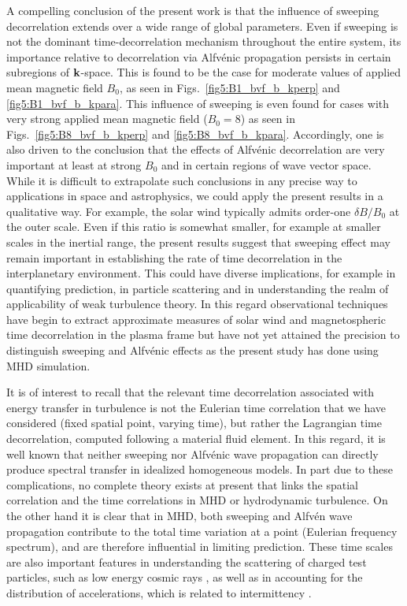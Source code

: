 \documentclass[aip,pop,reprint,amsmath,amssymb,floatfix]{revtex4-1}
\begin{document}
A compelling conclusion of the present work is that the influence of
sweeping decorrelation extends over a wide range of global
parameters. Even if sweeping is not the dominant time-decorrelation
mechanism throughout the entire system, its importance relative to
decorrelation via Alfv\'enic propagation persists in certain
subregions of ${\bf k}$-space. This is found to be the case for
moderate values of applied mean magnetic field $B_0$, as seen in
Figs.~\ref{fig5:B1_bvf_b_kperp} and \ref{fig5:B1_bvf_b_kpara}. This
influence of sweeping is even found for cases with very strong applied
mean magnetic field ($B_0 = 8$) as seen in
Figs.~\ref{fig5:B8_bvf_b_kperp} and
\ref{fig5:B8_bvf_b_kpara}. Accordingly, one is also driven to the
conclusion that the effects of Alfv\'enic decorrelation are very
important at least at strong $B_0$ and in certain regions of wave
vector space. While it is difficult to extrapolate such conclusions in
any precise way to applications in space and astrophysics, we could
apply the present results in a qualitative way. For example, the solar
wind typically admits order-one $\delta B/B_0 $ at the outer
scale. Even if this ratio is somewhat smaller, for example at smaller
scales in the inertial range, the present results suggest that
sweeping effect may remain important in establishing the rate of time
decorrelation in the interplanetary environment. This could have
diverse implications, for example in quantifying prediction, in
particle scattering and in understanding the realm of applicability of
weak turbulence theory. In this regard observational techniques have
begin to extract approximate measures of solar wind and magnetospheric
time decorrelation in the plasma frame
\cite{matthaeus_ensemble_2016,weygand_magnetic_2013} but have not yet
attained the precision to distinguish sweeping and Alfv\'enic effects
as the present study has done using MHD simulation.




It is of interest to recall that the relevant time decorrelation
associated with energy transfer in turbulence is not the Eulerian time
correlation that we have considered (fixed spatial point, varying
time), but rather the Lagrangian time decorrelation, computed
following a material fluid element.  In this regard, it is well known
that neither sweeping nor Alfv\'enic wave propagation can directly
produce spectral transfer in idealized homogeneous models.  In part
due to these complications, no complete theory exists at present that
links the spatial correlation and the time correlations in MHD or
hydrodynamic turbulence.  On the other hand it is clear that in MHD,
both sweeping and Alfv\'en wave propagation contribute to the total
time variation at a point (Eulerian frequency spectrum), and are
therefore influential in limiting prediction.  These time scales are
also important features in understanding the scattering of charged
test particles, such as low energy cosmic rays
\cite{bieber_proton_1994}, as well as in accounting for the
distribution of accelerations, which is related to intermittency
\cite{nelkin_time_1990}.
\end{document}
